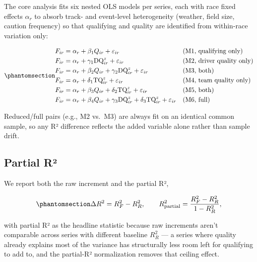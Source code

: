 \documentclass[
  10pt]{article}
\begin{document}
The core analysis fits six nested OLS models per series, each with race
fixed effects \(\alpha_r\) to absorb track- and event-level
heterogeneity (weather, field size, caution frequency) so that
qualifying and quality are identified from within-race variation only:

\begin{equation}\protect\phantomsection\label{eq-models}{
\begin{aligned}
F_{ir} &= \alpha_r + \beta_1 Q_{ir} + \varepsilon_{ir} &&\text{(M1, qualifying only)}\\
F_{ir} &= \alpha_r + \gamma_1 \text{DQ}^z_{ir} + \varepsilon_{ir} &&\text{(M2, driver quality only)}\\
F_{ir} &= \alpha_r + \beta_2 Q_{ir} + \gamma_2 \text{DQ}^z_{ir} + \varepsilon_{ir} &&\text{(M3, both)}\\
F_{ir} &= \alpha_r + \delta_1 \text{TQ}^z_{ir} + \varepsilon_{ir} &&\text{(M4, team quality only)}\\
F_{ir} &= \alpha_r + \beta_3 Q_{ir} + \delta_2 \text{TQ}^z_{ir} + \varepsilon_{ir} &&\text{(M5, both)}\\
F_{ir} &= \alpha_r + \beta_4 Q_{ir} + \gamma_3 \text{DQ}^z_{ir} + \delta_3 \text{TQ}^z_{ir} + \varepsilon_{ir} &&\text{(M6, full)}
\end{aligned}
}\end{equation}

Reduced/full pairs (e.g., M2 vs.~M3) are always fit on an identical
common sample, so any R² difference reflects the added variable alone
rather than sample drift.

\subsection{Partial R²}\label{partial-ruxb2}

We report both the raw increment and the partial R²,

\begin{equation}\protect\phantomsection\label{eq-partial-r2}{
\Delta R^2 = R^2_F - R^2_R, \qquad
R^2_{\text{partial}} = \frac{R^2_F - R^2_R}{1-R^2_R},
}\end{equation}

with partial R² as the headline statistic because raw increments aren't
comparable across series with different baseline \(R^2_R\) --- a series
where quality already explains most of the variance has structurally
less room left for qualifying to add to, and the partial-R²
normalization removes that ceiling effect.
\end{document}

